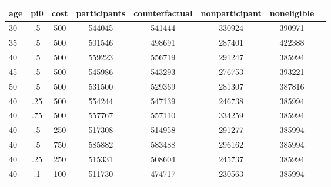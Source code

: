 \begin{table}[htbp]
\begin{tabular}{lccccccc} \hline \hline
 \multicolumn{1}{c}{ age }  & pi0  & cost  & participants  & counterfactual  & nonparticipant  & noneligible  \\  \hline 
       30 &        .5 &       500 &    544045 &    541444 &    330924 &    390971 \\  
       35 &        .5 &       500 &    501546 &    498691 &    287401 &    422388 \\  
       40 &        .5 &       500 &    559223 &    556719 &    291247 &    385994 \\  
       45 &        .5 &       500 &    545986 &    543293 &    276753 &    393221 \\  
       50 &        .5 &       500 &    531500 &    529369 &    281307 &    387816 \\  
       40 &       .25 &       500 &    554244 &    547139 &    246738 &    385994 \\  
       40 &       .75 &       500 &    557767 &    557110 &    334259 &    385994 \\  
       40 &        .5 &       250 &    517308 &    514958 &    291277 &    385994 \\  
       40 &        .5 &       750 &    585882 &    583488 &    296162 &    385994 \\  
       40 &       .25 &       250 &    515331 &    508604 &    245737 &    385994 \\  
       40 &        .1 &       100 &    511730 &    474717 &    230563 &    385994 \\  
\hline \hline \end{tabular}
\end{table}
